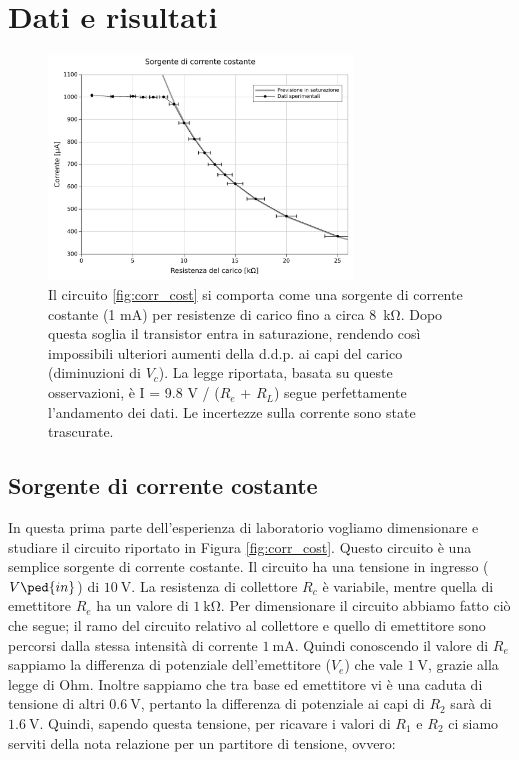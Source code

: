 \section*{Dati e risultati}

\begin{figure}
	\centering
	\includegraphics[width=0.72\textwidth]{current.pdf}
	\caption{Il circuito \ref{fig:corr_cost} si comporta come una sorgente di
	    corrente costante (1 mA)
	    per resistenze di carico fino a circa \SI{8}{\kilo\ohm}. Dopo questa soglia il transistor entra
	    in saturazione, rendendo così impossibili ulteriori aumenti della d.d.p. ai capi del carico
	    (diminuzioni di $V_c$).
	    La legge riportata, basata su queste osservazioni,
	     è I = 9.8 V / ($R_e$ + $R_L$) segue perfettamente
	    l'andamento dei dati.
	    Le incertezze sulla corrente sono state trascurate.}
	\label{fig:curr}
\end{figure}

\subsection*{Sorgente di corrente costante}

In questa prima parte dell'esperienza di laboratorio vogliamo dimensionare e studiare il circuito riportato in Figura \ref{fig:corr_cost}. Questo circuito è una semplice sorgente di corrente costante. Il circuito ha una tensione in ingresso ($V\ped{in}$) di $\SI{10}{\volt}$. La resistenza di collettore $R_c$ è variabile, mentre quella di emettitore $R_e$ ha un valore di $\SI{1}{\kilo\ohm}$.
Per dimensionare il circuito abbiamo fatto ciò che segue; il ramo del circuito relativo al collettore e quello di emettitore sono percorsi dalla stessa intensità di corrente $\SI{1}{\milli\ampere}$. Quindi conoscendo il valore di $R_e$ sappiamo la differenza di potenziale dell'emettitore ($V_e$) che vale $\SI{1}{\volt}$, grazie alla legge di Ohm. Inoltre sappiamo che tra base ed emettitore vi è una caduta di tensione di altri $\SI{0.6}{\volt}$, pertanto la differenza di potenziale ai capi di $R_2$ sarà di $\SI{1.6}{\volt}$.
Quindi, sapendo questa tensione, per ricavare i valori di $R_1$ e $R_2$ ci siamo serviti della nota relazione per un partitore di tensione, ovvero:

